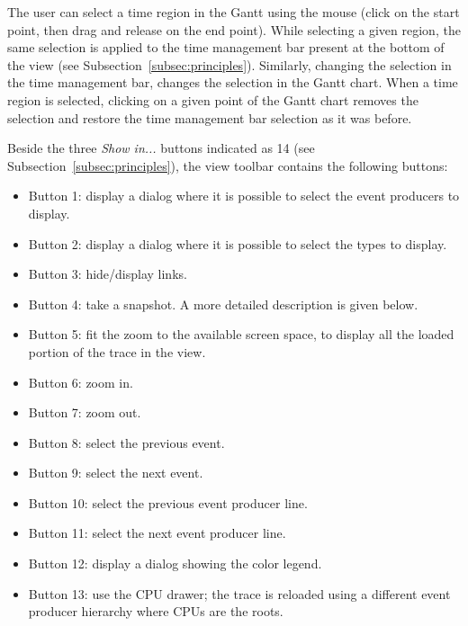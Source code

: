 \documentclass[twoside]{article}
\begin{document}
\begin{sloppypar}
The user can select a time region in the Gantt using the mouse (click on the start point, then drag and release on the end point). 
While selecting a given region, the same selection is applied to the time management bar present at the bottom of the view (see Subsection~\ref{subsec:principles}).
Similarly, changing the selection in the time management bar, changes the selection in the Gantt chart.
When a time region is selected, clicking on a given point of the Gantt chart removes the selection and restore the time management bar selection as it was before.

Beside the three \emph{Show in...} buttons indicated as \num{14} (see Subsection~\ref{subsec:principles}), the view toolbar contains the following buttons:
\begin{itemize}
	\item Button \num{1}: display a dialog where it is possible to select the event producers to display.
	\item Button \num{2}: display a dialog where it is possible to select the types to display.
	\item Button \num{3}: hide/display links.
	\item Button \num{4}: take a snapshot. A more detailed description is given below. 
	\item Button \num{5}: fit the zoom to the available screen space, to display all the loaded portion of the trace in the view.
    \item Button \num{6}: zoom in.
	\item Button \num{7}: zoom out.
  	\item Button \num{8}: select the previous event.
	\item Button \num{9}: select the next event.
	\item Button \num{10}: select the previous event producer line.
	\item Button \num{11}: select the next event producer line.
    \item Button \num{12}: display a dialog showing the color legend. 
	\item Button \num{13}: use the CPU drawer; the trace is reloaded using a different event producer hierarchy where CPUs are the roots.
\end{itemize}


\end{sloppypar}
\end{document}
